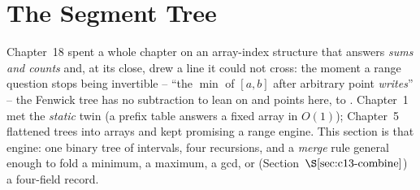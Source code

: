 \section{The Segment Tree}\label{sec:c13-core}

\begin{previouslybox}
Chapter~18 spent a whole chapter on an array-index structure that answers
\emph{sums and counts} and, at its close, drew a line it could not cross: the
moment a range question stops being invertible -- ``the \(\min\) of
\([a,b]\) after arbitrary point \emph{writes}'' -- the Fenwick tree has no
subtraction to lean on and points here, to .  Chapter~1 met the
\emph{static} twin (a prefix table answers a fixed array in \(O(1)\));
Chapter~5 flattened trees into arrays and kept promising a range engine.  This
section is that engine: one binary tree of intervals, four recursions, and a
\emph{merge} rule general enough to fold a minimum, a maximum, a gcd, or
(Section~\(\secref{c13-combine}\)) a four-field record.
\end{previouslybox}

